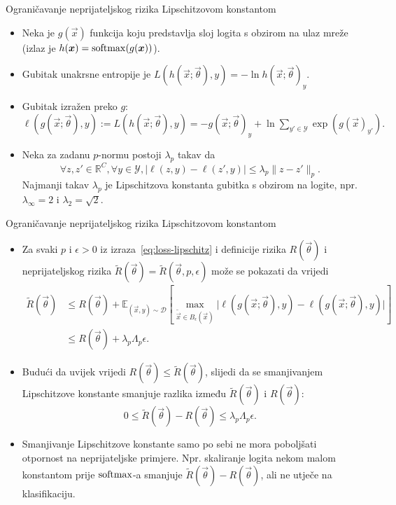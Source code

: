 \documentclass{beamer}
\begin{document}
\begin{frame}{Ograničavanje neprijateljskog rizika Lipschitzovom konstantom}
\begin{itemize}
	\item Neka je $g(\vec x)$ funkcija koju predstavlja sloj logita s obzirom na ulaz mreže (izlaz je $h(\vec x)=\softmax(g(\vec x))$).
	\item Gubitak unakrsne entropije je $L(h(\vec x;\vec\theta), y) = -\ln h(\vec x;\vec\theta)_y$.
	\item Gubitak izražen preko $g$: $\ell(g(\vec x;\vec\theta),y) := L(h(\vec x;\vec\theta), y) = -g(\vec x;\vec\theta)_y + \ln \sum_{y'\in\mathcal{Y}}\exp(g(\vec x)_{y'}).$
	\item Neka za zadanu $p$-normu postoji $\lambda_p$ takav da
	\begin{equation} \label{eq:loss-lipschitz}
	\forall z,z'\in \mathbb{R}^C, \forall y\in\mathcal{Y},
	\lvert \ell(z,y)-\ell(z',y)\rvert 
	\leq \lambda_p\lVert z-z'\rVert_p.
	\end{equation}
	Najmanji takav $\lambda_p$ je Lipschitzova konstanta gubitka s obzirom na logite, npr. $\lambda_\infty=2$ i $\lambda_2=\sqrt2$.
\end{itemize}
\end{frame}

\begin{frame}{Ograničavanje neprijateljskog rizika Lipschitzovom konstantom}
\begin{itemize}
	\item Za svaki $p$ i $\epsilon > 0$  iz izraza~\ref{eq:loss-lipschitz} i definicije rizika $R(\vec\theta)$ i neprijateljskog rizika $\widetilde{R}(\vec\theta)=\widetilde{R}(\vec\theta,p,\epsilon)$ može se pokazati da vrijedi
	\begin{align}
	\widetilde{R}(\vec\theta) 
	&\leq R(\vec\theta) + \mathbb{E}_{(\vec x,y)\sim\mathcal{D}}\left[
	\max_{\widetilde{\vec x} \in B_\epsilon(\vec x)} \lvert \ell(g(\vec x;\vec\theta),y)-\ell(g(\vec x;\vec\theta),y) \rvert \right] \\
	&\leq R(\vec\theta) + \lambda_p\Lambda_p\epsilon.
	\end{align}
	\item Budući da uvijek vrijedi $R(\vec\theta) \leq \widetilde{R}(\vec\theta)$, slijedi da se smanjivanjem Lipschitzove konstante smanjuje razlika između $\widetilde{R}(\vec\theta)$ i $R(\vec\theta)$:
	\begin{equation}
	0 \leq \widetilde{R}(\vec\theta)-R(\vec\theta) \leq \lambda_p\Lambda_p\epsilon.
	\end{equation}
	\item Smanjivanje Lipschitzove konstante samo po sebi ne mora poboljšati otpornost na neprijateljske primjere. Npr. skaliranje logita nekom malom konstantom prije $\operatorname{softmax}$-a smanjuje $\widetilde{R}(\vec\theta)-R(\vec\theta)$, ali ne utječe na klasifikaciju.
\end{itemize}
\end{frame}
\end{document}
